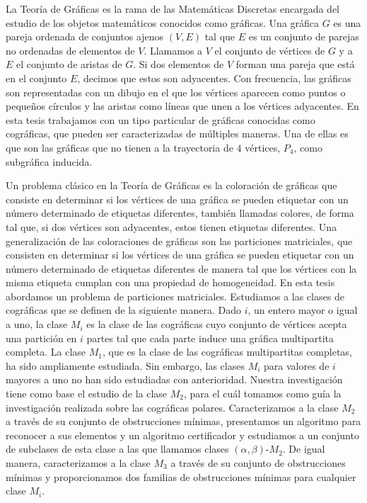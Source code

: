 La Teoría de Gráficas es la rama de las Matemáticas Discretas encargada del estudio de los objetos matemáticos conocidos como gráficas. Una gráfica $G$ es una pareja ordenada de conjuntos ajenos $(V,E)$ tal que $E$ es un conjunto de parejas no ordenadas de elementos de $V$. Llamamos a $V$ el conjunto de vértices de $G$ y a $E$ el conjunto de aristas de $G$. Si dos elementos de $V$ forman una pareja que está en el conjunto $E$, decimos que estos son adyacentes. Con frecuencia, las gráficas son representadas con un dibujo en el que los vértices aparecen como puntos o pequeños círculos y las aristas como líneas que unen a los vértices adyacentes. En esta tesis trabajamos con un tipo particular de gráficas conocidas como cográficas, que pueden ser caracterizadas de múltiples maneras. Una de ellas es que son las gráficas que no tienen a la trayectoria de $4$ v\'ertices, $P_4$, como subgráfica inducida.

Un problema clásico en la Teoría de Gráficas es la coloración de gráficas que consiste en determinar si los vértices de una gráfica se pueden etiquetar con un número determinado de etiquetas diferentes, también llamadas colores, de forma tal que, si dos vértices son adyacentes, estos tienen etiquetas diferentes. Una generalización de las coloraciones de gráficas son las particiones matriciales, que consisten en determinar si los vértices de una gráfica se pueden etiquetar con un número determinado de etiquetas diferentes de manera tal que los vértices con la misma etiqueta cumplan con una propiedad de homogeneidad. En esta tesis abordamos un problema de particiones matriciales. Estudiamos a las clases de cográficas que se definen de la siguiente manera. Dado $i$, un entero mayor o igual a uno, la clase $M_i$ es la clase de las cográficas cuyo conjunto de vértices acepta una partición en $i$ partes tal que cada parte induce una gráfica multipartita completa. La clase $M_1$, que es la clase de las cográficas multipartitas completas, ha sido ampliamente estudiada. Sin embargo, las clases $M_i$ para valores de $i$ mayores a uno no han sido estudiadas con anterioridad. Nuestra investigación tiene como base el estudio de la clase $M_2$, para el cuál tomamos como guía la investigación realizada sobre las cográficas polares. Caracterizamos a la clase $M_2$ a través de su conjunto de obstrucciones mínimas, presentamos un algoritmo para reconocer a sus elementos y un algoritmo certificador y estudiamos a un conjunto de subclases de esta clase a las que llamamos clases $(\alpha,\beta)$-$M_2$. De igual manera, caracterizamos a la clase $M_3$ a través de su conjunto de obstrucciones mínimas y proporcionamos dos familias de obstrucciones mínimas para cualquier clase $M_i$.
